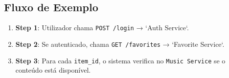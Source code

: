 \documentclass[a4paper,12pt]{article}
\begin{document}
\subsection{Fluxo de Exemplo}
\begin{enumerate}
    \item \textbf{Step 1}: Utilizador chama \texttt{POST /login} → `Auth Service`.  
    \item \textbf{Step 2}: Se autenticado, chama \texttt{GET /favorites} → `Favorite Service`.  
    \item \textbf{Step 3}: Para cada \texttt{item\_id}, o sistema verifica no \texttt{Music Service} se o conteúdo está disponível.  
\end{enumerate}
\end{document}
